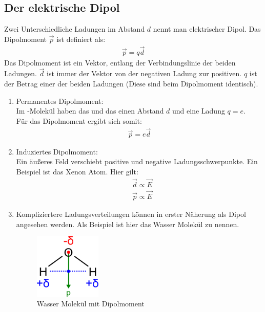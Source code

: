 \documentclass{scrartcl}
\begin{document}
\subsection{Der elektrische Dipol}
Zwei Unterschiedliche Ladungen im Abstand $d$ nennt man elektrischer Dipol.
Das Dipolmoment $\vec{p}$ ist definiert als:
\begin{align}
    \vec{p}=q\vec{d}
\end{align}
Das Dipolmoment ist ein Vektor, entlang der Verbindungslinie der beiden Ladungen.
$\vec{d}$ ist immer der Vektor von der negativen Ladung zur positiven. $q$ ist der Betrag einer der
beiden Ladungen (Diese sind beim Dipolmoment identisch).
\begin{enumerate}
    \item Permanentes Dipolmoment:\\
    Im -Molekül haben das  und das  einen Abstand $d$ und eine Ladung $q=e$.\\
    Für das Dipolmoment ergibt sich somit:
    \begin{align}
        \vec{p}=e\vec{d}
    \end{align}
    \item Induziertes Dipolmoment:\\
        Ein äußeres Feld verschiebt positive und negative Ladungsschwerpunkte.
        Ein Beispiel ist das Xenon Atom. Hier gilt:
        \begin{align}
            &\vec{d}\propto \vec{E}\\
            &\vec{p}\propto \vec{E}
        \end{align}
    \item Kompliziertere Ladungsverteilungen können in erster Näherung als Dipol angesehen werden. Als Beispiel ist hier 
    das Wasser Molekül zu nennen.
    \begin{figure}[H]
        \centering
        \includegraphics[width=0.3\textwidth]{Dipole_Water.png}
        \caption{Wasser Molekül mit Dipolmoment}
    \end{figure}
\end{enumerate}
\end{document}
